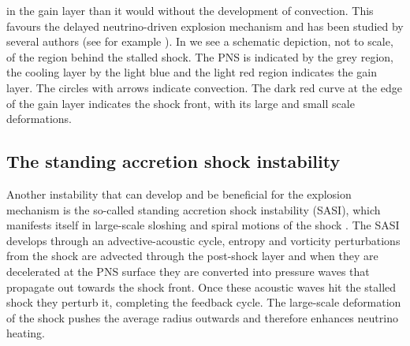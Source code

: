 in the gain layer than it would without the development of convection.
This favours the delayed neutrino-driven explosion mechanism and has been studied by several authors
(see for example \cite{herant_94,burrows_95,janka_96,foglizzo_06,mueller_12a}).
In  we see a schematic depiction, not to scale, of
the region behind the stalled shock. The PNS is indicated by the grey region, the cooling layer by the light blue and
the light red region indicates the gain layer. The circles with arrows indicate convection. The dark red curve
at the edge of the gain layer indicates the shock front, with its large and small scale deformations.

\subsection{The standing accretion shock instability}
Another instability that can develop and be beneficial for the explosion mechanism is 
the so-called standing accretion shock instability (SASI), which manifests itself in large-scale 
sloshing and spiral motions of the shock \citep{blondin_03,blondin_06,foglizzo_07,ohnishi_06,ohnishi_08,scheck_08,guilet_12,foglizzo_15}.
The SASI develops through an advective-acoustic cycle, entropy and vorticity perturbations from the shock are advected through the
post-shock layer and when they are decelerated at the PNS surface they are converted into pressure waves that propagate
out towards the shock front. Once these acoustic waves hit the stalled shock they perturb it, completing the feedback
cycle. The large-scale deformation of the shock pushes the average radius outwards and therefore enhances neutrino heating.
 
